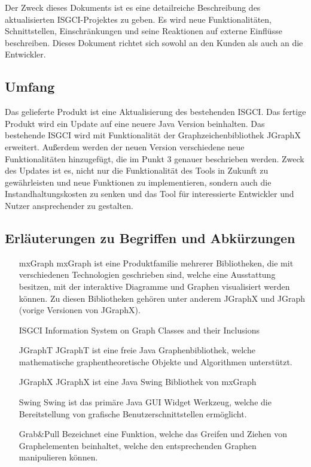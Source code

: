 \documentclass[11pt,a4paper]{article}
\begin{document}
	Der Zweck dieses Dokuments ist es eine detailreiche Beschreibung des aktualisierten ISGCI-Projektes zu geben. Es wird neue Funktionalitäten, Schnittstellen, Einschränkungen und seine Reaktionen auf externe Einflüsse beschreiben. Dieses Dokument richtet sich sowohl an den Kunden als auch an die Entwickler.
	

  	\subsection{Umfang} %
   Das gelieferte Produkt ist eine Aktualisierung des bestehenden ISGCI. Das fertige Produkt wird ein Update auf eine neuere Java Version beinhalten. Das bestehende ISGCI wird mit Funktionalität der Graphzeichenbibliothek JGraphX erweitert. Außerdem werden der neuen Version verschiedene neue Funktionalitäten hinzugefügt, die im Punkt 3 genauer beschrieben werden. Zweck des Updates ist es, nicht nur die Funktionalität des Tools in Zukunft zu gewährleisten und neue Funktionen zu implementieren, sondern auch die Instandhaltungskosten zu senken und das Tool für interessierte Entwickler und Nutzer ansprechender zu gestalten.

  	\subsection{Erläuterungen zu Begriffen und Abkürzungen} %

	        \begin{itemize}
	        \item[mxGraph] mxGraph ist eine Produktfamilie mehrerer Bibliotheken, die mit verschiedenen Technologien geschrieben sind, welche eine Ausstattung besitzen, mit der interaktive Diagramme und Graphen visualisiert werden können. Zu diesen Bibliotheken gehören unter anderem JGraphX und JGraph (vorige Versionen von JGraphX).
	        \item[ISGCI] Information System on Graph Classes and their Inclusions
	        \item[JGraphT] JGraphT ist eine freie Java Graphenbibliothek, welche mathematische graphentheoretische Objekte und Algorithmen unterstützt. 
	        \item[JGraphX] JGraphX ist eine Java Swing Bibliothek von mxGraph
	        \item[Swing] Swing ist das primäre Java GUI Widget Werkzeug, welche die Bereitstellung von grafische Benutzerschnittstellen ermöglicht.
	        \item[Grab\&Pull] Bezeichnet eine Funktion, welche das Greifen und Ziehen von Graphelementen beinhaltet, welche den entsprechenden Graphen manipulieren können.
	        \end{itemize}
	        
\end{document}
